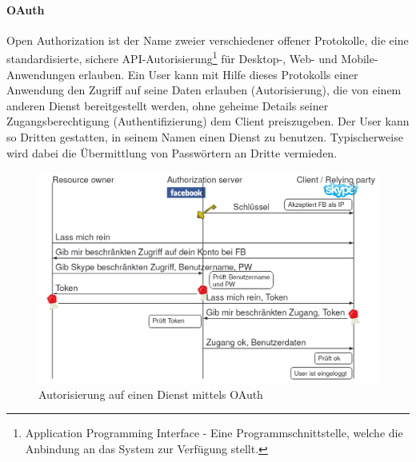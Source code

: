 \documentclass[10pt,a4paper]{article}
\begin{document}
\paragraph*{OAuth}Open Authorization ist der Name zweier verschiedener offener Protokolle, die eine standardisierte, sichere API-Autorisierung\footnote{Application Programming Interface - Eine Programmschnittstelle, welche die Anbindung an das System zur Verfügung stellt.} für Desktop-, Web- und Mobile-Anwendungen erlauben. Ein User kann mit Hilfe dieses Protokolls einer Anwendung den Zugriff auf seine Daten erlauben (Autorisierung), die von einem anderen Dienst bereitgestellt werden, ohne geheime Details seiner Zugangsberechtigung (Authentifizierung) dem Client preiszugeben. Der User kann so Dritten gestatten, in seinem Namen einen Dienst zu benutzen. Typischerweise wird dabei die Übermittlung von Passwörtern an Dritte vermieden.\cite{wiki}
\begin{figure}[H]
    \begin{center}
    \includegraphics[width=12cm]{images/OAuth0.png}
    \caption{Autorisierung auf einen Dienst mittels OAuth}
    \label{oauth}
    \end{center}
\end{figure}
\end{document}
